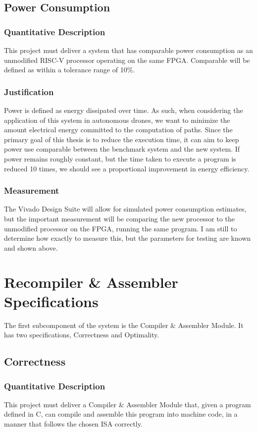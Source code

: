 \documentclass[11pt, oneside]{article}      %
\begin{document}
\subsection{Power Consumption}
\subsubsection{Quantitative Description}
This project must deliver a system that has comparable power consumption as an unmodified RISC-V processor operating on the same FPGA. Comparable will be defined as within a tolerance range of 10\%.
\subsubsection{Justification}
Power is defined as energy dissipated over time.\cite{AmericanElectricianHandbook} As such, when considering the application of this system in autonomous drones, we want to minimize the amount electrical energy committed to the computation of paths. Since the primary goal of this thesis is to reduce the execution time, it can aim to keep power use comparable between the benchmark system and the new system. If power remains roughly constant, but the time taken to execute a program is reduced 10 times, we should see a proportional improvement in energy efficiency.
\subsubsection{Measurement}
The Vivado Design Suite\cite{Vivado} will allow for simulated power consumption estimates, but the important measurement will be comparing the new processor to the unmodified processor on the FPGA, running the same program. I am still to determine how exactly to measure this, but the parameters for testing are known and shown above.


\section{Recompiler \& Assembler Specifications}
The first subcomponent of the system is the Compiler \& Assembler Module. It has two specifications, Correctness and Optimality. 
\subsection{Correctness}
\subsubsection{Quantitative Description}
This project must deliver a Compiler \& Assembler Module that, given a program defined in C, can compile and assemble this program into machine code, in a manner that follows the chosen ISA correctly. 
\end{document}
